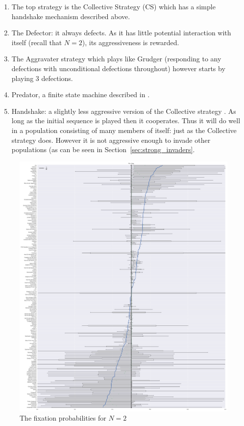 \documentclass{article}
\begin{document}
\begin{enumerate}
    \item The top strategy is the Collective Strategy (CS) which has a simple
        handshake mechanism described above.
    \item The Defector: it always defects. As it has little potential
        interaction with itself (recall that \(N=2\)), its
        aggressiveness is rewarded.
    \item The Aggravater strategy which plays like Grudger (responding to any
        defections with unconditional defections throughout) however starts by
        playing 3 defections.
    \item Predator, a finite state machine described in \cite{Ashlock2006}.
    \item Handshake: a slightly less aggressive version of the Collective
        strategy \cite{robson1989}. As long as the initial sequence is played
        then it cooperates. Thus it will do well in a population consisting of
        many members of itself: just as the Collective strategy does. However it
        is not aggressive enough to invade other populations (as can be seen in
        Section~\ref{sec:strong_invaders}.
\end{enumerate}


\begin{figure}[!hbtp]
    \centering
    \includegraphics[height=.9\textheight]{./img/boxplot_2_invade.pdf}
    \caption{The fixation probabilities for \(N=2\)}
    \label{fig:boxplot_2}
\end{figure}
\end{document}
